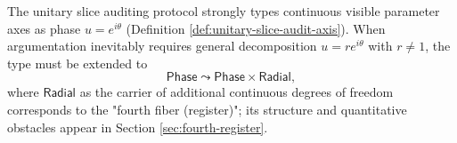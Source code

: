 \begin{remark}\label{rem:unitary-slice-type-closure}
The unitary slice auditing protocol strongly types continuous visible parameter axes as phase $u=e^{i\theta}$ (Definition \ref{def:unitary-slice-audit-axis}). When argumentation inevitably requires general decomposition $u=re^{i\theta}$ with $r\neq 1$, the type must be extended to
$$
\mathsf{Phase}\leadsto \mathsf{Phase}\times \mathsf{Radial},
$$
where $\mathsf{Radial}$ as the carrier of additional continuous degrees of freedom corresponds to the "fourth fiber (register)"; its structure and quantitative obstacles appear in Section \ref{sec:fourth-register}.\par
\end{remark}
